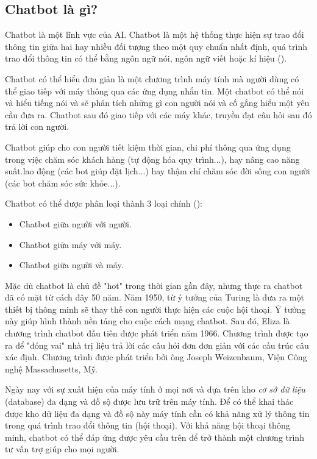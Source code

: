 \subsection{Chatbot là gì?}\par
Chatbot là một lĩnh vực của AI. Chatbot là một hệ thống thực hiện sự trao đổi thông tin giữa hai hay nhiều đối tượng theo một quy chuẩn nhất định, quá trình trao đổi thông tin có thể bằng ngôn ngữ nói, ngôn ngữ viết hoặc kí hiệu (\cite{hoang2011ung}).\par
Chatbot có thể hiểu đơn giản là một chương trình máy tính mà người dùng có thể giao tiếp với máy thông qua các ứng dụng nhắn tin. Một chatbot có thể nói và hiểu tiếng nói và sẽ phân tích những gì con người nói và cố gắng hiểu một yêu cầu đưa ra. Chatbot sau đó giao tiếp với các máy khác, truyền đạt câu hỏi sau đó trả lời con người.\par
Chatbot giúp cho con người tiết kiệm thời gian, chi phí thông qua ứng dụng trong việc chăm sóc khách hàng (tự động hóa quy trình...), hay nâng cao năng suất.lao động (các bot giúp đặt lịch...) hay thậm chí chăm sóc đời sống con người (các bot chăm sóc sức khỏe...).\par
Chatbot có thể được phân loại thành 3 loại chính (\cite{hoang2011ung}):
\begin{itemize}
	\item Chatbot giữa người với người.
	\item Chatbot giữa máy với máy.
	\item Chatbot giữa người và máy.
\end{itemize}\par
Mặc dù chatbot là chủ đề "hot" trong thời gian gần đây, nhưng thực ra chatbot đã có mặt từ cách đây 50 năm. Năm 1950, từ ý tưởng của Turing là đưa ra một thiết bị thông minh sẽ thay thế con người thực hiện các cuộc hội thoại. Ý tưởng này giúp hình thành nền tảng cho cuộc cách mạng chatbot. Sau đó, Eliza là chương trình chatbot đầu tiên được phát triển năm 1966. Chương trình được tạo ra để "đóng vai" nhà trị liệu trả lời các câu hỏi đơn đơn giản với các cấu trúc câu xác định. Chương trình được phát triển bởi ông Joseph Weizenbaum, Viện Công nghệ Massachusetts, Mỹ.\par
Ngày nay với sự xuất hiện của máy tính ở mọi nơi và dựa trên kho \textit{cơ sở dữ liệu} (database) đa dạng và đồ sộ được lưu trữ trên máy tính. Để có thể khai thác được kho dữ liệu đa dạng và đồ sộ này máy tính cần có khả năng xử lý thông tin trong quá trình trao đổi thông tin (hội thoại). Với khả năng hội thoại thông minh, chatbot có thể đáp ứng được yêu cầu trên để trở thành một chương trình tư vấn trợ giúp cho mọi người.\par

